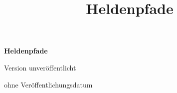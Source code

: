 \documentclass[11pt,a4paper,oneside]{book}
\title{Heldenpfade}
\author{}
\date{}
\newcommand{\HPDocumentVersion}{unveröffentlicht}
\newcommand{\HPDocumentDate}{ohne Veröffentlichungsdatum}
\newcommand{\HPDocumentStatus}{Version}
\begin{document}
\frontmatter
\begin{titlepage}
  \centering
  \vspace*{0.22\textheight}
  {\Huge\bfseries Heldenpfade\par}
  \vfill
  {\small
    \HPDocumentStatus{} \HPDocumentVersion\par
    \vspace{0.35em}
    \HPDocumentDate\par
  }
\end{titlepage}
\tableofcontents

\mainmatter










\appendix







\end{document}
